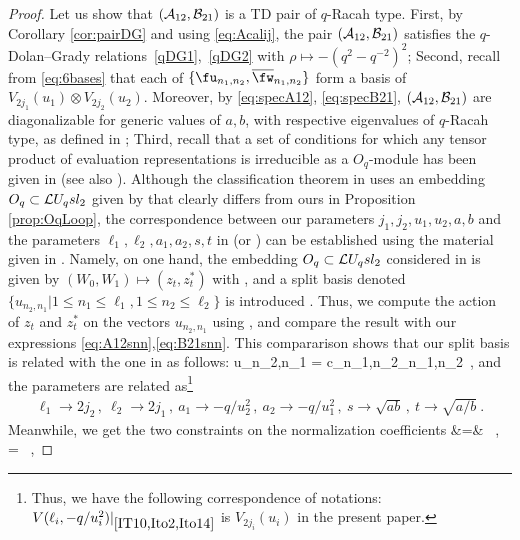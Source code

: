 \documentclass[11pt]{amsart}
\numberwithin{equation}{section}
\numberwithin{equation}{section}
\begin{document}
\begin{proof} Let us show that $({\cal A}_{12},{\cal B}_{21})$ is a TD pair of $q$-Racah type.
First, by Corollary \ref{cor:pairDG} and using \eqref{eq:Acalij}, the pair $({\cal A}_{12},{\cal B}_{21})$ satisfies the $q$-Dolan--Grady relations~\eqref{qDG1},~\eqref{qDG2} with $\rho \mapsto -(q^2-q^{-2})^2$; Second, recall from \eqref{eq:6bases} that each of $\{\fu_{n_1,n_2},\overline{\fw}_{n_1,n_2}\}$ form a basis of $V_{2j_1}(u_1)\otimes V_{2j_2}(u_2)$. Moreover, by \eqref{eq:specA12}, \eqref{eq:specB21}, $({\cal A}_{12},{\cal B}_{21})$ are diagonalizable for generic values of $a,b$, with respective eigenvalues of $q$-Racah type, as defined in \cite[Def.\,3.1]{IT08}; Third, recall that a set of conditions for which any tensor product of evaluation representations
is irreducible as a $O_q$-module has been given in \cite[Thm.\,1.17\, (i)]{IT10} (see also  \cite[Thm.\,5.17 (1)(i)-(iii)]{Ito2}). Although the classification theorem in \cite{IT10} uses an embedding $O_q \subset \mathcal{L} U_q sl_2$ given by \cite[Eqs.\,(45) with eqs.(44)]{Ito2} that clearly differs from ours in Proposition \ref{prop:OqLoop}, the correspondence between our parameters $j_1,j_2,u_1,u_2,a,b$ and the parameters $\ell_1,\ell_2,a_1,a_2,s,t$ in \cite[Thm.\,1.17\, (i)]{IT10}  (or \cite[Thm.\,5.17]{Ito2}) can be established using the material given in \cite{Ito2}. Namely, on one hand, the embedding $O_q \subset \mathcal{L} U_q sl_2$  considered in \cite{IT10,Ito2,Ito14} is given by $(W_0,W_1)\mapsto (z_t,z_t^*)$ with \cite[Eqs.\,(36),(37)]{Ito2}, and a split basis denoted $\{u_{n_2,n_1}|1\leq n_1\leq \ell_1,1\leq n_2\leq \ell_2\}$ is introduced \cite[Eq.\,(59)]{Ito2}. Thus, we compute the action of $z_t$ and $z_t^*$ on the vectors $u_{n_2,n_1}$ using \cite[Thm.\,3]{Ito2}, and compare the result with our expressions \eqref{eq:A12snn},\eqref{eq:B21snn}. This compararison shows that our split basis is related with the one in \cite{Ito2} as follows:
\beqa
u_{n_2,n_1} = c_{n_1,n_2}\fs_{n_1,n_2}\ ,
\eeqa
and the parameters are related as\footnote{Thus, we have the following correspondence of notations: $V(\ell_i,-q/u_i^2)|_{ \mbox{\cite{IT10,Ito2,Ito14}}}$ is $V_{2j_i}(u_i)$ in the present paper.\label{foot:VV}}
\begin{align}
\ell_1\to 2j_2\,, \ \ell_2\to 2j_1\,,\ a_1\to -q/u_2^2 \,,\ a_2\to -q/u_1^2\,,\ s \to \sqrt{ab}\,,\ t \to \sqrt{a/b}\ .\label{def:cor}
\end{align}
Meanwhile, we get the two constraints on the normalization coefficients 
\beqa
  &=& \frac{[2j_1-n_1]}{[n_1+1]}\ ,\quad {} = \frac{[2j_2-n_2]}{[n_2+1]} \ ,

\end{proof}
\end{document}
